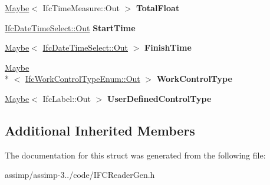 \begin{DoxyCompactItemize}
\item 
\hypertarget{struct_assimp_1_1_i_f_c_1_1_ifc_work_control_a5fba7ae912f09ac80ad2951bde049240}{\hyperlink{struct_assimp_1_1_s_t_e_p_1_1_maybe}{Maybe}$<$ Ifc\+Time\+Measure\+::\+Out $>$ {\bfseries Total\+Float}}\label{struct_assimp_1_1_i_f_c_1_1_ifc_work_control_a5fba7ae912f09ac80ad2951bde049240}

\item 
\hypertarget{struct_assimp_1_1_i_f_c_1_1_ifc_work_control_aab0d10833245fc7bb6c53865325d985d}{\hyperlink{classboost_1_1shared__ptr}{Ifc\+Date\+Time\+Select\+::\+Out} {\bfseries Start\+Time}}\label{struct_assimp_1_1_i_f_c_1_1_ifc_work_control_aab0d10833245fc7bb6c53865325d985d}

\item 
\hypertarget{struct_assimp_1_1_i_f_c_1_1_ifc_work_control_a6689b6abdaced46b8281b6f5f2293272}{\hyperlink{struct_assimp_1_1_s_t_e_p_1_1_maybe}{Maybe}$<$ \hyperlink{classboost_1_1shared__ptr}{Ifc\+Date\+Time\+Select\+::\+Out} $>$ {\bfseries Finish\+Time}}\label{struct_assimp_1_1_i_f_c_1_1_ifc_work_control_a6689b6abdaced46b8281b6f5f2293272}

\item 
\hypertarget{struct_assimp_1_1_i_f_c_1_1_ifc_work_control_a783affb4b90f1da7a363feaba841cdd4}{\hyperlink{struct_assimp_1_1_s_t_e_p_1_1_maybe}{Maybe}\\*
$<$ \hyperlink{classboost_1_1shared__ptr}{Ifc\+Work\+Control\+Type\+Enum\+::\+Out} $>$ {\bfseries Work\+Control\+Type}}\label{struct_assimp_1_1_i_f_c_1_1_ifc_work_control_a783affb4b90f1da7a363feaba841cdd4}

\item 
\hypertarget{struct_assimp_1_1_i_f_c_1_1_ifc_work_control_aeaaff005b42334cd0ed5794b388b205d}{\hyperlink{struct_assimp_1_1_s_t_e_p_1_1_maybe}{Maybe}$<$ Ifc\+Label\+::\+Out $>$ {\bfseries User\+Defined\+Control\+Type}}\label{struct_assimp_1_1_i_f_c_1_1_ifc_work_control_aeaaff005b42334cd0ed5794b388b205d}

\end{DoxyCompactItemize}
\subsection*{Additional Inherited Members}


The documentation for this struct was generated from the following file\+:\begin{DoxyCompactItemize}
\item 
assimp/assimp-\/3../code/I\+F\+C\+Reader\+Gen.\+h\end{DoxyCompactItemize}
